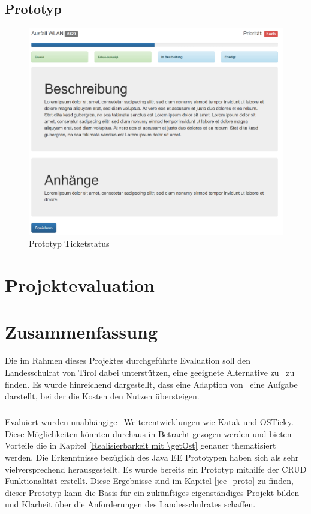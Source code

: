 \section{Prototyp}
\begin{figure}[h]
	\centering
	\includegraphics[scale=.5]{figures/Prototyp.png}
	\caption{Prototyp Ticketstatus}
	\label{Abb_Prototyp_Ticketstatus}
\end{figure}



\chapter{Projektevaluation}


\chapter{Zusammenfassung}
Die im Rahmen dieses Projektes durchgeführte Evaluation soll den Landesschulrat von Tirol dabei unterstützen, eine geeignete Alternative zu \getOst\ zu finden. Es wurde hinreichend dargestellt, dass eine Adaption von \getOst\ eine Aufgabe darstellt, bei der die Kosten den Nutzen übersteigen.
\paragraph{}
Evaluiert wurden unabhängige \getOst\ Weiterentwicklungen wie Katak und OSTicky. Diese Möglichkeiten könnten durchaus in Betracht gezogen werden und bieten Vorteile die in Kapitel \ref{Realisierbarkeit mit \getOst} genauer thematisiert werden. Die Erkenntnisse bezüglich des Java EE Prototypen haben sich als sehr vielversprechend herausgestellt. Es wurde bereits ein Prototyp mithilfe der CRUD Funktionalität erstellt. Diese Ergebnisse sind im Kapitel \ref{jee_proto} zu finden, dieser Prototyp kann die Basis für ein zukünftiges eigenständiges Projekt bilden und Klarheit über die Anforderungen des Landesschulrates schaffen.
